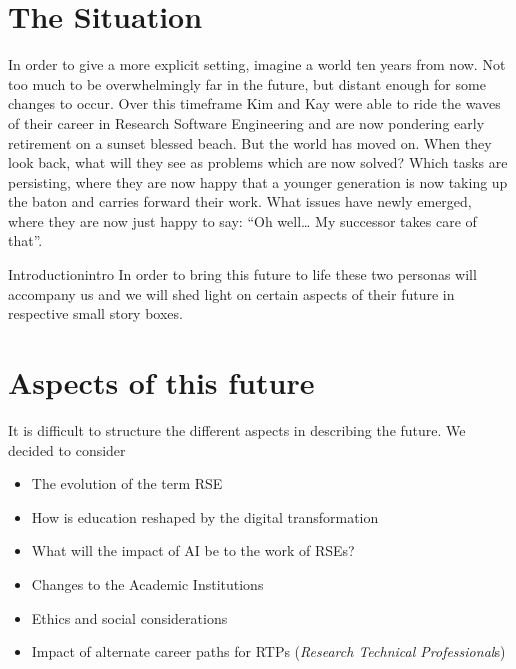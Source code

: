 \documentclass{eceasst}
\begin{document}
\section{The Situation}
In order to give a more explicit setting, imagine a world ten years from now.
Not too much to be overwhelmingly far in the future, but distant enough for some changes to occur.
Over this timeframe Kim\cite{Anzt2021} and Kay\cite{Goth2024}
were able to ride the waves of their career in Research Software Engineering and are now pondering early retirement on a sunset blessed beach.
But the world has moved on.
When they look back, what will they see as problems which are now solved?
Which tasks are persisting, where they are now happy that a younger generation is now taking up the baton and carries forward their work.
What issues have newly emerged, where they are now just happy to say: “Oh well… My successor takes care of that”.
\begin{story}{Introduction}{intro}
In order to bring this future to life these two personas will accompany us and we will shed light on certain aspects
of their future in respective small story boxes.
 \end{story}

\section{Aspects of this future}
It is difficult to structure the different aspects in describing the future. We decided to consider
\begin{itemize}
\item The evolution of the term RSE
\item How is education reshaped by the digital transformation
\item What will the impact of AI be to the work of RSEs?
\item Changes to the Academic Institutions
\item Ethics and social considerations
\item Impact of alternate career paths for RTPs (\emph{Research Technical Professional}s)
\end{itemize}

\end{document}
